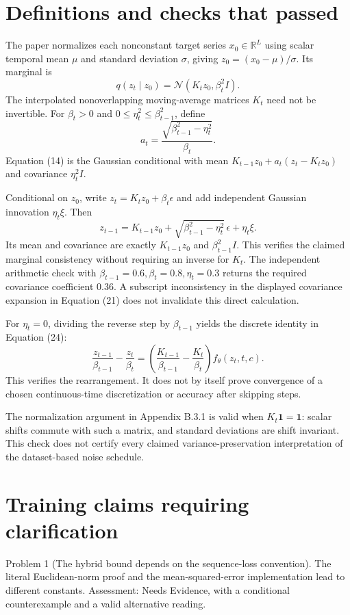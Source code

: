 \documentclass[10pt]{article}
\begin{document}
\section*{Definitions and checks that passed}
The paper normalizes each nonconstant target series \(x_0\in\mathbb R^L\) using scalar temporal mean \(\mu\) and standard deviation \(\sigma\), giving \(z_0=(x_0-\mu)/\sigma\). Its marginal is \[q(z_t\mid z_0)=\mathcal N(K_tz_0,\beta_t^2 I).\] The interpolated nonoverlapping moving-average matrices \(K_t\) need not be invertible. For \(\beta_t>0\) and \(0\leq\eta_t^2\leq\beta_{t-1}^2\), define \[a_t=\frac{\sqrt{\beta_{t-1}^2-\eta_t^2}}{\beta_t}.\] Equation (14) is the Gaussian conditional with mean \(K_{t-1}z_0+a_t(z_t-K_tz_0)\) and covariance \(\eta_t^2 I\).\par
Conditional on \(z_0\), write \(z_t=K_tz_0+\beta_t\epsilon\) and add independent Gaussian innovation \(\eta_t\xi\). Then \[z_{t-1}=K_{t-1}z_0+
\sqrt{\beta_{t-1}^2-\eta_t^2}\,\epsilon+\eta_t\xi.\] Its mean and covariance are exactly \(K_{t-1}z_0\) and \(\beta_{t-1}^2 I\). This verifies the claimed marginal consistency without requiring an inverse for \(K_t\). The independent arithmetic check with \(\beta_{t-1}=0.6,\beta_t=0.8,\eta_t=0.3\) returns the required covariance coefficient \(0.36\). A subscript inconsistency in the displayed covariance expansion in Equation (21) does not invalidate this direct calculation.\par
For \(\eta_t=0\), dividing the reverse step by \(\beta_{t-1}\) yields the discrete identity in Equation (24): \[\frac{z_{t-1}}{\beta_{t-1}}-\frac{z_t}{\beta_t}
 =\left(\frac{K_{t-1}}{\beta_{t-1}}-\frac{K_t}{\beta_t}\right)
   f_\theta(z_t,t,c).\] This verifies the rearrangement. It does not by itself prove convergence of a chosen continuous-time discretization or accuracy after skipping steps.\par
The normalization argument in Appendix B.3.1 is valid when \(K_t\mathbf 1=\mathbf 1\): scalar shifts commute with such a matrix, and standard deviations are shift invariant. This check does not certify every claimed variance-preservation interpretation of the dataset-based noise schedule.\par
\section*{Training claims requiring clarification}
Problem 1 (The hybrid bound depends on the sequence-loss convention).  The literal Euclidean-norm proof and the mean-squared-error implementation lead to different constants. Assessment: Needs Evidence, with a conditional counterexample and a valid alternative reading.\par
\end{document}
